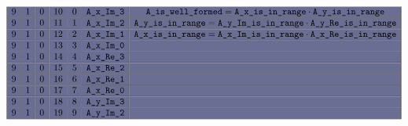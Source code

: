 \begin{figure}[h!]
\begin{adjustwidth}{-2cm}{-2cm}
{\[\begin{array}{|c|c|c|c|c|c|c|}
       \rowcolor{mybackground} 9 & 1      & 0      & 10          & 0         & \locAXImThree              & \locAIsWellFormed = \locAXIsInRange   \cdot \locAYIsInRange                                                                   \\ \hline
       \rowcolor{mybackground} 9 & 1      & 0      & 11          & 1         & \locAXImTwo                & \locAYIsInRange =   \locAYImIsInRange \cdot \locAYReIsInRange                                                                 \\ \hline
       \rowcolor{mybackground} 9 & 1      & 0      & 12          & 2         & \locAXImOne                & \locAXIsInRange =   \locAXImIsInRange \cdot \locAXReIsInRange                                                                 \\ \hline
       \rowcolor{mybackground} 9 & 1      & 0      & 13          & 3         & \locAXImZero               &                                                                                                                               \\ \hline
       \rowcolor{mybackground} 9 & 1      & 0      & 14          & 4         & \locAXReThree              &                                                                                                                               \\ \hline
       \rowcolor{mybackground} 9 & 1      & 0      & 15          & 5         & \locAXReTwo                &                                                                                                                               \\ \hline
       \rowcolor{mybackground} 9 & 1      & 0      & 16          & 6         & \locAXReOne                &                                                                                                                               \\ \hline
       \rowcolor{mybackground} 9 & 1      & 0      & 17          & 7         & \locAXReZero               &                                                                                                                               \\ \hline
       \rowcolor{mybackground} 9 & 1      & 0      & 18          & 8         & \locAYImThree              &                                                                                                                               \\ \hline
       \rowcolor{mybackground} 9 & 1      & 0      & 19          & 9         & \locAYImTwo                &                                                                                                                               \\ \hline

\end{array}\]}
\end{adjustwidth}
\end{figure}
